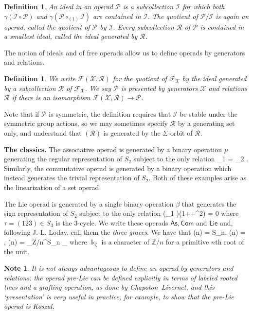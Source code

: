 \documentclass[fleqn,a4paper, twoside]{article}
\makeatletter
\newcommand{\0}{\langle 0\rangle}
\newcommand{\XX}{\mathcal{X}}
\newcommand{\RR}{\mathcal{R}}
\newcommand{\FF}{\mathcal{F}}
\let\[\@undefined
\DeclareRobustCommand{\[}{\begin{equation}}%
\let\]\@undefined
\DeclareRobustCommand{\]}{\end{equation}}%
\theoremstyle{mytheorem}
\theoremstyle{introthm}
\theoremstyle{mydefinition}
\newtheorem{definition}[theorem]{Definition}
\newtheorem{note}[theorem]{Note}
\theoremstyle{mydefinition2}
\theoremstyle{plain} %
\newcommand{\As}{\mathsf{As}}
\newcommand{\Com}{\mathsf{Com}}
\newcommand{\Lie}{\mathsf{Lie}}
\newcommand{\?}{\,?\,}
\newcommand{\kk}{\Bbbk}
\newcommand{\PP}{{\mathcal{P}}}
\theoremstyle{mytheorem}
\theoremstyle{plain} %
\makeatother
\begin{document}
\begin{definition} An ideal in an operad $\PP$
is a subcollection $\mathcal{I}$ for which
both $\gamma(\mathcal{I}\circ \PP)$ and
$\gamma(\PP\circ_{(1)} \mathcal{I})$ are contained in
$\mathcal{I}$.
The quotient of $\PP/\mathcal{I}$ is again an
operad, called the quotient of $\PP$ 
by $\mathcal{I}$. Every subcollection $\RR$
of $\PP$ is contained in a smallest
ideal, called the \emph{ideal generated by $\RR$}.
\end{definition}

The notion of ideals and of free operads allow us
to define operads by generators and relations.

\begin{definition}
We write $\FF(\XX,\RR)$ for the quotient of 
$\FF_\XX$
by the ideal generated by a subcollection $\RR$
of $\FF_\XX$. 
 We say $\PP$ is presented by generators
$\XX$ and relations $\RR$ if there is an
isomorphism $\FF(\XX,\RR) \longrightarrow
\PP$.
\end{definition}

Note that if $\PP$ is symmetric, the definition
requires that $\mathcal{I}$ be stable under
the symmetric group actions, so we may 
sometimes specify $\RR$ by a generating set 
only, and understand
that $(\RR)$ is generated by the $\Sigma$-orbit
of $\RR$.

\medskip

\textbf{The classics.}
The associative operad is generated by a 
binary operation $\mu$ generating the regular
representation of $S_2$ subject to the only relation
\[ \mu\circ_1 \mu = \mu \circ_2 \mu. \] 
Similarly, the commutative operad is generated by a 
binary operation which instead generates the
trivial representation of $S_2$. Both of these
examples arise as the linearization of a set operad.

The Lie operad is generated by a single binary 
operation $\beta$ that generates the sign 
representation of $S_2$ subject to the only
relation
\[ (\beta \circ_1 \beta)(1+\tau+\tau^2) = 0 \] 
where $\tau = (123)\in S_3$ is the $3$-cycle. 
We write these operads $\mathsf{As},\mathsf{Com}$
and $\mathsf{Lie}$ and, following J.-L. Loday,
call them the \emph{three graces}. We have that
\[ \As(n) = \kk S_n,\quad
 	\Com(n) = \kk, \quad
 	 \Lie(n) = _{\mathbb Z/n}^{S_n} \kk_\zeta \] 
 where $\kk_\zeta$ is a character of $\mathbb Z/n$
 for a primitive $n$th root of the unit. 
 
 
\begin{note} It is not always advantageous
to define an operad by generators and relations:
the operad pre-Lie can be defined explicitly
in terms of labeled rooted trees and a grafting
operation, as done by Chapoton--Livernet, and
this `presentation' is very useful in practice,
for example, to show that the pre-Lie operad
is Koszul.
\end{note}
\end{document}
